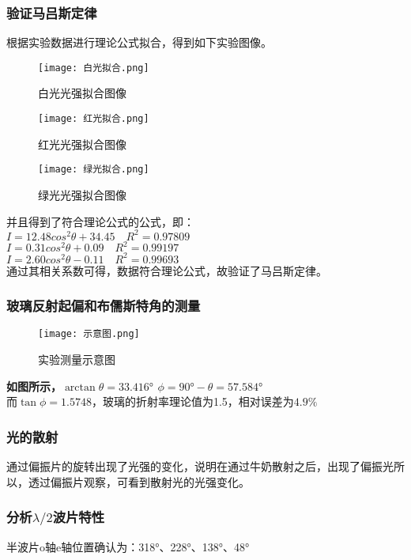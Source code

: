 \documentclass[dvipsnames, svgnames,a4paper,11pt]{article}
\begin{document}
	\subsubsection{验证马吕斯定律}
	根据实验数据进行理论公式拟合，得到如下实验图像。
	\begin{figure}[H]
		\begin{minipage}[b]{0.3\linewidth}
		  \centering
		  \texttt{[image: 白光拟合.png]}
		  \caption{白光光强拟合图像}
		\end{minipage}
		\hfill
		\begin{minipage}[b]{0.3\linewidth}
		  \centering
		  \texttt{[image: 红光拟合.png]}
		  \caption{红光光强拟合图像}
		\end{minipage}
		\hfill
		\begin{minipage}[b]{0.3\linewidth}
		  \centering
		  \texttt{[image: 绿光拟合.png]}
		  \caption{绿光光强拟合图像}
		\end{minipage}
	\end{figure}
	并且得到了符合理论公式的公式，即：\\
	$I=12.48cos^2\theta+34.45\quad R^2=0.97809$\\
	$I=0.31cos^2\theta+0.09\quad R^2=0.99197$\\
	$I=2.60cos^2\theta-0.11\quad R^2=0.99693$\\
    通过其相关系数可得，数据符合理论公式，故验证了马吕斯定律。
    \subsubsection{玻璃反射起偏和布儒斯特角的测量}
	\begin{figure}[{H}]
		\centering
		\texttt{[image: 示意图.png]}
		\caption{实验测量示意图}
		\label{}
	   \end{figure}
	   \textbf{如图所示，$\arctan\theta=33.416°$ \quad $\phi=90°-\theta=57.584°$}\\
	   \indent 而$\tan\phi=1.5748$，玻璃的折射率理论值为1.5，相对误差为$4.9\%$

 

	\subsubsection{光的散射}
	通过偏振片的旋转出现了光强的变化，说明在通过牛奶散射之后，出现了偏振光所以，透过偏振片观察，可看到散射光的光强变化。
	
	
	\subsubsection{分析$\lambda/2$波片特性}
	半波片o轴e轴位置确认为：318°、228°、138°、48°
\end{document}
